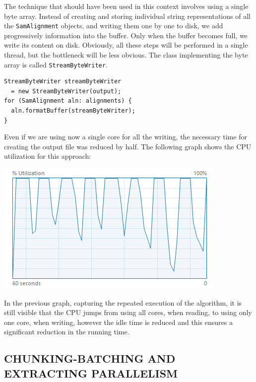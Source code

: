 \documentclass[a4paper,twoside]{article}
\begin{document}
{The technique that should have been used in this context involves using a single byte array.
Instead of creating and storing individual string representations of all the {\texttt{SamAlignment}} objects, and writing them one by one to disk, we add progressively information into the buffer.
Only when the buffer becomes full, we write its content on disk.
Obviously, all these steps will be performed in a single thread, but the bottleneck will be less obvious.
The class implementing the byte array is called {\texttt{StreamByteWriter}}.
\begin{verbatim}
StreamByteWriter streamByteWriter 
  = new StreamByteWriter(output);
for (SamAlignment aln: alignments) {
  aln.formatBuffer(streamByteWriter);
}
\end{verbatim}
Even if we are using now a single core for all the writing, the necessary time for creating the output file was reduced by half.
The following graph shows the CPU utilization for this approach:
\begin{center}
\includegraphics[scale=0.5]{images/cpu_optimized.png}
\end{center}

In the previous graph, capturing the repeated execution of the algorithm, it is still visible that the CPU jumps from using all cores, when reading, to using only one core, when writing, however the idle time is reduced and this ensures a significant reduction in the running time.


\subsection{\uppercase{Chunking-Batching and Extracting Parallelism}} 
\label{subsec:batching}

}
\end{document}
